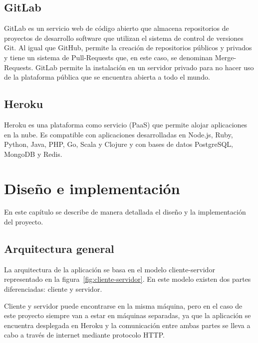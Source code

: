 \documentclass[a4paper, 12pt]{book}
\begin{document}
\section{GitLab} 
\label{sec:gitlab}

GitLab\cite{gitlab} es un servicio web de código abierto que almacena repositorios de proyectos de desarrollo software que utilizan el sistema de control de versiones Git. Al igual que GitHub, permite la creación de repositorios públicos y privados y tiene un sistema de Pull-Requests que, en este caso, se denominan Merge-Requests.
GitLab permite la instalación en un servidor privado para no hacer uso de la plataforma pública que se encuentra abierta a todo el mundo.

\section{Heroku} 
\label{sec:Heroku}

Heroku\cite{heroku} es una plataforma como servicio (PaaS) que permite alojar aplicaciones en la nube. Es compatible con aplicaciones desarrolladas en Node.js, Ruby, Python, Java, PHP, Go, Scala y Clojure y con bases de datos PostgreSQL, MongoDB y Redis.


\cleardoublepage
\chapter{Diseño e implementación}

En este capítulo se describe de manera detallada el diseño y la implementación del proyecto.

\section{Arquitectura general} 
\label{sec:arquitectura}

La arquitectura de la aplicación se basa en el modelo cliente-servidor representado en la figura~\ref{fig:cliente-servidor}.
En este modelo existen dos partes diferenciadas: cliente y servidor.

Cliente y servidor puede encontrarse en la misma máquina, pero en el caso de este proyecto siempre van a estar en máquinas separadas, ya que la aplicación se encuentra desplegada en Heroku y la comunicación entre ambas partes se lleva a cabo a través de internet mediante protocolo HTTP.
\end{document}
